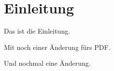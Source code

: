\chapter{Einleitung}
\label{cha:Einleitung}

Das ist die Einleitung.

Mit noch einer Änderung fürs PDF.

Und nochmal eine Änderung.